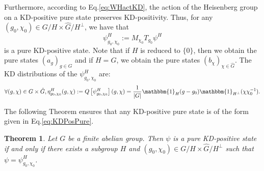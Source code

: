 \documentclass[a4paper, notitlepage, 11pt]{article}
\numberwithin{equation}{section}
\newtheorem{Theorem}{Theorem}[section]
\begin{document}
Furthermore, according to Eq.\eqref{eq:WHactKD}, the action of the Heisenberg group on a KD-positive pure state preserves KD-positivity. Thus, for any $(g_{0},\chi_{0})\in G/H \times \hat{G}/H^{\perp}$, we have that 
\begin{equation}\label{def:KDPure2}
    \psi^{H}_{g_{0},\chi_{0}}:= M_{\chi_0}T_{g_{0}}\psi^{H}
\end{equation} 
is a pure KD-positive state. Note that if $H$ is reduced to $\{0\}$, then we obtain the pure states $(a_g)_{g\in G}$ and if $H=G$, we obtain the pure states $(b_{\chi})_{\chi\in\hat{G}}$. The KD distributions of the $\psi^{H}_{g_{0},\chi_{0}}$ are:
\begin{equation}\label{eq:KDPosPure}
 \forall (g,\chi)\in G\times\hat{G}, \eta^{H}_{g_0,\chi_0}(g,\chi): =Q\left[\psi^{H}_{g_{0},\chi_{0}}\right] (g,\chi)= \frac{1}{\left|G\right|}\mathbbm{1}_{H}(g-g_0)\mathbbm{1}_{H^{\perp}}(\chi\chi_{0}^{-1}).
\end{equation}


The following Theorem ensures that any  KD-positive pure state is of the form given in Eq.\eqref{eq:KDPosPure}.
\begin{Theorem}\label{thm:KDPure}
     Let $G$ be a finite abelian group. Then $\psi$ is a pure KD-positive state if and only if there exists a subgroup $H$ and $(g_0,\chi_0)\in G/H \times\hat{G}/H^{\perp}$ such that $\psi = \psi^{H}_{g_0,\chi_0}$.
 \end{Theorem}
\end{document}
